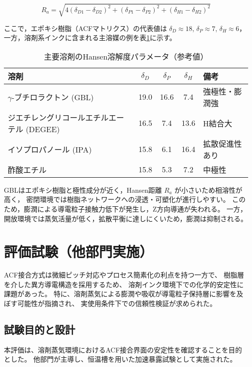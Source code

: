 \documentclass[conference]{IEEEtran}
\begin{document}
\[
R_a=\sqrt{4(\delta_{D1}-\delta_{D2})^2+(\delta_{P1}-\delta_{P2})^2+(\delta_{H1}-\delta_{H2})^2}
\]

ここで，エポキシ樹脂（ACFマトリクス）の代表値は
$\delta_D\!\approx\!18$, $\delta_P\!\approx\!7$, $\delta_H\!\approx\!6$，
一方，溶剤系インクに含まれる主溶媒の例を表\ref{tab:HSP}に示す。

\begin{table}[h]
\centering
\caption{主要溶剤のHansen溶解度パラメータ（参考値）}
\label{tab:HSP}
\begin{tabularx}{\columnwidth}{@{}l c c c l@{}}
\toprule
溶剤 & $\delta_D$ & $\delta_P$ & $\delta_H$ & 備考 \\
\midrule
$\gamma$-ブチロラクトン (GBL) & 19.0 & 16.6 & 7.4 & 強極性・膨潤強 \\
ジエチレングリコールエチルエーテル (DEGEE) & 16.5 & 7.4 & 13.6 & H結合大 \\
イソプロパノール (IPA) & 15.8 & 6.1 & 16.4 & 拡散促進性あり \\
酢酸エチル & 15.8 & 5.3 & 7.2 & 中極性 \\
\bottomrule
\end{tabularx}
\end{table}

GBLはエポキシ樹脂と極性成分が近く，Hansen距離 $R_a$ が小さいため相溶性が高く，
密閉環境では樹脂ネットワークへの浸透・可塑化が進行しやすい。
このため，膨潤による導電粒子接触力低下が発生し，Z方向導通が失われる。
一方，開放環境では蒸気活量が低く，拡散平衡に達しにくいため，膨潤は抑制される。

\section{評価試験（他部門実施）}

ACF接合方式は微細ピッチ対応やプロセス簡素化の利点を持つ一方で、  
樹脂層を介した異方導電構造を採用するため、  
溶剤インク環境下での化学的安定性に課題があった。  
特に、溶剤蒸気による膨潤や吸収が導電粒子保持層に影響を及ぼす可能性が指摘され、  
実使用条件下での信頼性検証が求められた。

\subsection{試験目的と設計}
本評価は、溶剤蒸気環境におけるACF接合界面の安定性を確認することを目的とした。  
他部門が主導し、恒温槽を用いた加速暴露試験として実施された。  
\end{document}
